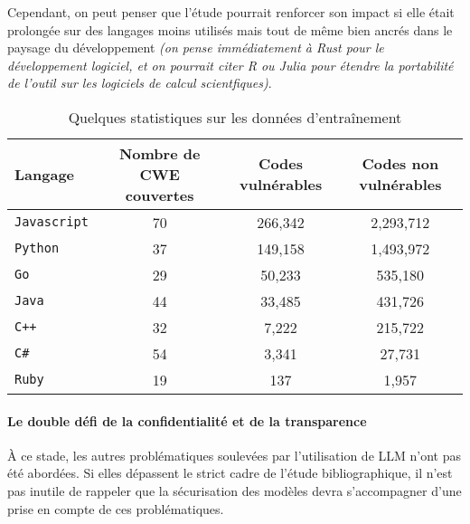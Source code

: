                     Cependant, on peut penser que l'étude pourrait renforcer son impact si elle
                    était prolongée sur des langages moins utilisés mais tout de même bien
                    ancrés dans le paysage du développement
                    \textit{(on pense immédiatement à Rust pour le développement logiciel, et on pourrait citer R ou Julia pour étendre la portabilité de l'outil sur les logiciels de calcul scientfiques)}.
                    \begin{table}[H]
                        \centering
                        \begin{tabular}{lccc}
                            \toprule
                            \textbf{Langage} & \textbf{Nombre de CWE couvertes} &
                            \textbf{Codes vulnérables} & \textbf{Codes non vulnérables} \\
                            \midrule
                            \texttt{Javascript} & 70 & 266,342 & 2,293,712 \\
                            \texttt{Python} & 37 & 149,158 & 1,493,972 \\
                            \texttt{Go} & 29 & 50,233 & 535,180 \\
                            \texttt{Java} & 44 & 33,485 & 431,726 \\
                            \texttt{C++} & 32 & 7,222 & 215,722 \\
                            \texttt{C\#} & 54 & 3,341 & 27,731 \\
                            \texttt{Ruby} & 19 & 137 & 1,957 \\
                            \bottomrule
                        \end{tabular}
                        \caption{Quelques statistiques sur les données d'entraînement\cite{mainArticle}}
                    \end{table}
                \paragraph*{Le double défi de la confidentialité et de la transparence}
                    À ce stade, les autres problématiques soulevées par l'utilisation de LLM
                    n'ont pas été abordées. Si elles dépassent le strict cadre de l'étude
                    bibliographique, il n'est pas inutile de rappeler que la sécurisation des
                    modèles devra s'accompagner d'une prise en compte de ces problématiques.

